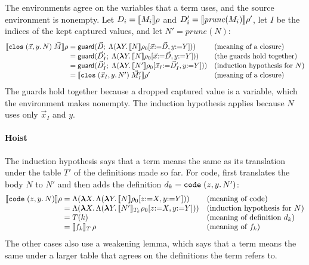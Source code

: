 The environments agree on the variables that a term uses, and the
source environment is nonempty. Let $D_i = \llbracket M_i \rrbracket\rho$ and $D'_i =
\llbracket \mathit{prune}(M_i) \rrbracket\rho'$, let $I$ be the indices of the kept
captured values, and let $N' = \mathit{prune}(N)$:
{\small
\[
\begin{array}{@{}r@{\;}c@{\;}l@{\quad}l@{}}
  \den{\kw{clos}\;(\vec{x}, y.\,N)\;\vec{M}}\rho
    & = & \mathsf{guard}(\vec{D};\; \Lambda(\mlam{Y} \den{N}\rho_0[\vec{x}{:=}\vec{D}, y{:=}Y])) & \text{(meaning of a closure)}\\
    & = & \mathsf{guard}(\vec{D}'_I;\; \Lambda(\mlam{Y} \den{N}\rho_0[\vec{x}{:=}\vec{D}, y{:=}Y])) & \text{(the guards hold together)}\\
    & = & \mathsf{guard}(\vec{D}'_I;\; \Lambda(\mlam{Y} \den{N'}\rho_0[\vec{x}_I{:=}\vec{D}'_I, y{:=}Y])) & \text{(induction hypothesis for $N$)}\\
    & = & \den{\kw{clos}\;(\vec{x}_I, y.\,N')\;\vec{M}'_I}\rho' & \text{(meaning of a closure)}
\end{array}
\]}
The guards hold together because a dropped captured value is a
variable, which the environment makes nonempty. The induction
hypothesis applies because $N$ uses only $\vec{x}_I$ and $y$.

\paragraph{Hoist}

The induction hypothesis says that a term means the same as its
translation under the table $T'$ of the definitions made so far. For
code,  first translates the body $N$ to $N'$ and then
adds the definition $d_k = \mathtt{code}\;(z, y.\,N')$:
{\small
\[
\begin{array}{@{}r@{\;}c@{\;}l@{\quad}l@{}}
  \den{\kw{code}\;(z, y.\,N)}\rho
    & = & \Lambda(\mlam{X} \Lambda(\mlam{Y} \den{N}\rho_0[z{:=}X, y{:=}Y])) & \text{(meaning of code)}\\
    & = & \Lambda(\mlam{X} \Lambda(\mlam{Y} \den{N'}_{T_k}\rho_0[z{:=}X, y{:=}Y])) & \text{(induction hypothesis for $N$)}\\
    & = & T(k) & \text{(meaning of definition $d_k$)}\\
    & = & \den{f_k}_T\,\rho & \text{(meaning of $f_k$)}
\end{array}
\]}
The other cases also use a weakening lemma, which says that a term means the same under
a larger table that agrees on the definitions the term refers to.

